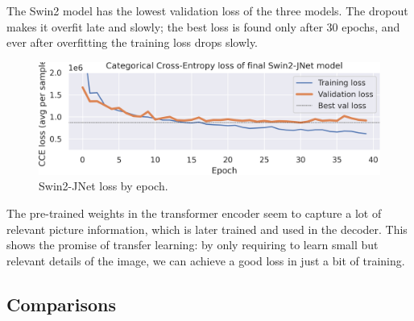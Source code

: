 The Swin2 model has the lowest validation loss of the three models.
The dropout makes it overfit late and slowly; the best loss is found only after 30 epochs, and ever after overfitting the training loss drops slowly.

\begin{figure}[h]
	\centering
	\includegraphics[width=.9\textwidth]{swin2_loss.png}
	\caption{Swin2-JNet loss by epoch.}
\end{figure}

The pre-trained weights in the transformer encoder seem to capture a lot of relevant picture information, which is later trained and used in the decoder.
This shows the promise of transfer learning: by only requiring to learn small but relevant details of the image, we can achieve a good loss in just a bit of training.

\subsection{Comparisons}
\label{comparisons}

